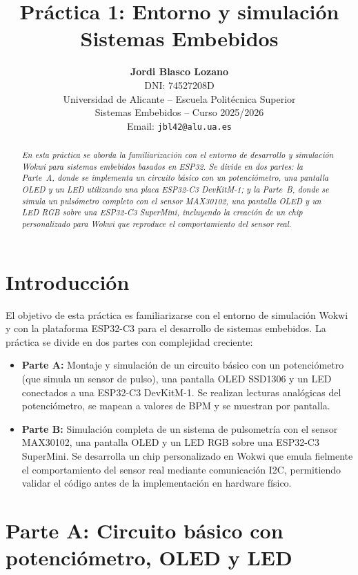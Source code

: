 \documentclass[11pt,a4paper]{article}
\title{\textbf{Práctica 1: Entorno y simulación}\\
\large Sistemas Embebidos}
\author{
    \textbf{Jordi Blasco Lozano}\\
    \small DNI: 74527208D\\
    \small Universidad de Alicante -- Escuela Politécnica Superior\\
    \small Sistemas Embebidos -- Curso 2025/2026\\
    \small Email: \texttt{jbl42@alu.ua.es}
}
\date{}
\begin{document}
\maketitle

\begin{abstract}
\textit{En esta práctica se aborda la familiarización con el entorno de desarrollo y simulación Wokwi para sistemas embebidos basados en ESP32. Se divide en dos partes: la Parte~A, donde se implementa un circuito básico con un potenciómetro, una pantalla OLED y un LED utilizando una placa ESP32-C3 DevKitM-1; y la Parte~B, donde se simula un pulsómetro completo con el sensor MAX30102, una pantalla OLED y un LED RGB sobre una ESP32-C3 SuperMini, incluyendo la creación de un chip personalizado para Wokwi que reproduce el comportamiento del sensor real.}
\end{abstract}

\vspace{0.5cm}

\section{Introducción}

El objetivo de esta práctica es familiarizarse con el entorno de simulación Wokwi y con la plataforma ESP32-C3 para el desarrollo de sistemas embebidos. La práctica se divide en dos partes con complejidad creciente:

\begin{itemize}
    \item \textbf{Parte A:} Montaje y simulación de un circuito básico con un potenciómetro (que simula un sensor de pulso), una pantalla OLED SSD1306 y un LED conectados a una ESP32-C3 DevKitM-1. Se realizan lecturas analógicas del potenciómetro, se mapean a valores de BPM y se muestran por pantalla.
    \item \textbf{Parte B:} Simulación completa de un sistema de pulsometría con el sensor MAX30102, una pantalla OLED y un LED RGB sobre una ESP32-C3 SuperMini. Se desarrolla un chip personalizado en Wokwi que emula fielmente el comportamiento del sensor real mediante comunicación I2C, permitiendo validar el código antes de la implementación en hardware físico.
\end{itemize}

\section{Parte A: Circuito básico con potenciómetro, OLED y LED}
\end{document}
